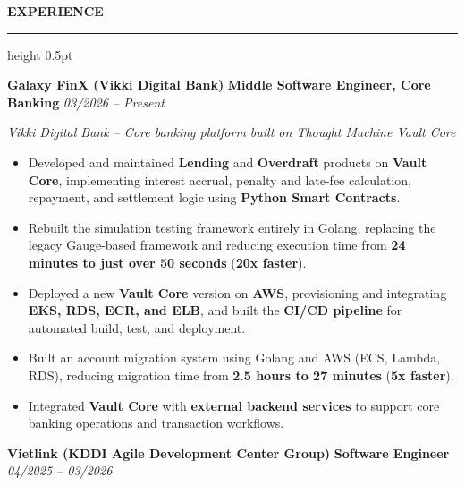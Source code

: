 \documentclass[a4paper,10pt]{article}
\newcommand{\cvsection}[1]{%
    \par
    \vspace{4pt}%
    \noindent
    {\normalsize\textbf{#1}}%
    \par
    \vspace{1pt}%
    \hrule height 0.5pt
    \vspace{2.5pt}%
}
\newcommand{\experience}[3]{%
    \noindent
    \textbf{#1}
    \hspace{3pt}\textbar\hspace{3pt}
    \textbf{#2}
    \hfill
    \textit{#3}
    \par
}
\newcommand{\companydesc}[1]{%
    \vspace{0.8pt}
    {\small\textit{#1}}
    \par
    \vspace{-0.6pt}
}
\newcommand{\jobspace}{%
    \vspace{2pt}
}
\begin{document}

\cvsection{EXPERIENCE}


\experience
{Galaxy FinX (Vikki Digital Bank)}
{Middle Software Engineer, Core Banking}
{03/2026 -- Present}

\companydesc{
Vikki Digital Bank -- Core banking platform built on Thought Machine Vault Core
}

\begin{itemize}

    \item Developed and maintained
    \textbf{Lending} and \textbf{Overdraft}
    products on \textbf{Vault Core}, implementing
    interest accrual, penalty and late-fee calculation,
    repayment, and settlement logic using
    \textbf{Python Smart Contracts}.

    \item Rebuilt the simulation testing framework entirely
    in Golang, replacing the legacy Gauge-based framework
    and reducing execution time from
    \textbf{24 minutes to just over 50 seconds}
    (\textbf{20x faster}).

    \item Deployed a new \textbf{Vault Core} version on
    \textbf{AWS}, provisioning and integrating
    \textbf{EKS, RDS, ECR, and ELB}, and built the
    \textbf{CI/CD pipeline} for automated build, test,
    and deployment.

    \item Built an account migration system using
    Golang and AWS (ECS, Lambda, RDS), reducing migration
    time from \textbf{2.5 hours to 27 minutes}
    (\textbf{5x faster}).

    \item Integrated \textbf{Vault Core} with
    \textbf{external backend services} to support core
    banking operations and transaction workflows.

\end{itemize}

\jobspace


\experience
{Vietlink (KDDI Agile Development Center Group)}
{Software Engineer}
{04/2025 -- 03/2026}
\end{document}
